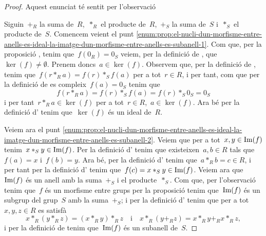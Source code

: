 \documentclass[../../main.tex]{subfiles}
\begin{document}
    \begin{proof}
        Aquest enunciat té sentit per l'observació 

        Siguin~\(+_{R}\) la suma de~\(R\),~\(\ast_{R}\) el producte de~\(R\),~\(+_{S}\) la suma de~\(S\) i~\(\ast_{S}\) el producte de~\(S\).
        Comencem veient el punt \eqref{enum:prop:el-nucli-dun-morfisme-entre-anells-es-ideal-la-imatge-dun-morfisme-entre-anells-es-subanell-1}.
        Com que, per la proposició , tenim que~\(f(0_{R})=0_{S}\) veiem, per la definició de , que~\(\ker(f)\neq\emptyset\).
        Prenem doncs~\(a\in\ker(f)\).
        Observem que, per la definició de , tenim que~\(f(r\ast_{R}a)=f(r)\ast_{S}f(a)\) per a tot~\(r\in R\), i per tant, com que per la definició de  es compleix~\(f(a)=0_{S}\) tenim que \[f(r\ast_{R}a)=f(r)\ast_{S}f(a)=f(r)\ast_{S}0_{S}=0_{S}\]
        i per tant~\(r\ast_{R}a\in\ker(f)\) per a tot~\(r\in R\),~\(a\in\ker(f)\).
        Ara bé per la definició d' tenim que~\(\ker(f)\) és un ideal de~\(R\).

        Veiem ara el punt \eqref{enum:prop:el-nucli-dun-morfisme-entre-anells-es-ideal-la-imatge-dun-morfisme-entre-anells-es-subanell-2}.
        Veiem que per a tot~\(x,y\in\operatorname{Im}(f)\) tenim~\(x\ast_{S}y\in\operatorname{Im}(f)\).
        Per la definició d' tenim que existeixen~\(a,b\in R\) tals que~\(f(a)=x\) i~\(f(b)=y\).
        Ara bé, per la definició d' tenim que~\(a\ast_{R}b=c\in R\), i per tant per la definició d' tenim que~\(f(c)=x\ast_{S}y\in\operatorname{Im}(f)\).
        Veiem ara que~\(\operatorname{Im}(f)\) és un anell amb la suma~\(+_{S}\) i el producte~\(\ast_{S}\).
        Com que, per l'observació  tenim que~\(f\) és un morfisme entre grups per la proposició  tenim que~\(\operatorname{Im}(f)\) és un subgrup del grup~\(S\) amb la suma~\(+_{S}\); i per la definició d' tenim que per a tot~\(x,y,z\in R\) es satisfà
        \[
            x\ast_{R}(y\ast_{R}z)=(x\ast_{R}y)\ast_{R}z\quad\text{i}\quad x\ast_{R}(y+_{R}z)=x\ast_{R}y+_{R}x\ast_{R}z,
        \]
        i per la definició de  tenim que~\(\operatorname{Im}(f)\) és un subanell de~\(S\).
    \end{proof}
\end{document}
